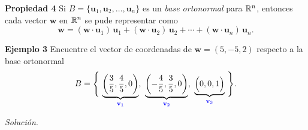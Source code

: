 \begin{frame}%

\begin{prop}{\textbf{Propiedad 4}}
	\justifying
	Si $B = \{ \mathbf{u}_1, \mathbf{u}_2, \hdots, \mathbf{u}_n\}$ es un \textit{base ortonormal} para $\mathbb{R}^n$, entonces
	cada vector $\mathbf{w}$ en $\mathbb{R}^n$ se pude representar como
	\[
	\mathbf{w} = (\mathbf{w}\cdot \mathbf{u}_1)\, \mathbf{u}_1 + (\mathbf{w}\cdot \mathbf{u}_2)\, \mathbf{u}_2 + \cdots 
	+ (\mathbf{w}\cdot \mathbf{u}_n)\, \mathbf{u}_n.
	\]
	
	\vspace{-1mm}
\end{prop}		

\begin{ej}{\textbf{Ejemplo 3}}\justifying 
	Encuentre el vector de coordenadas de $\mathbf{w}=(5,-5,2)$ respecto a la base ortonormal
	\[
	B = \Bigg\{ \, \underbrace{\left( \frac{3}{5}, \frac{4}{5}, 0 \right)}_{\color{blue}\mathbf{v}_1}, \ 
	\underbrace{\left( -\frac{4}{5}, \frac{3}{5}, 0 \right)}_{\color{blue}\mathbf{v}_2}, \ 
	\underbrace{\Big( 0, 0, 1 \Big)}_{\color{blue}\mathbf{v}_3} \, \Bigg\}.
	\]
\end{ej}
\textit{Solución}.

\end{frame}


\subsection{}

